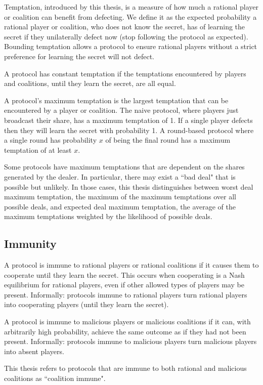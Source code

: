 \documentclass{dalcsthesis}
\begin{document}
Temptation, introduced by this thesis, is a measure of how much a rational player or coalition can benefit from defecting. We define it as the expected probability a rational player or coalition, who does not know the secret, has of learning the secret if they unilaterally defect now (stop following the protocol as expected). Bounding temptation allows a protocol to ensure rational players without a strict preference for learning the secret will not defect.

A protocol has constant temptation if the temptations encountered by players and coalitions, until they learn the secret, are all equal.

A protocol's maximum temptation is the largest temptation that can be encountered by a player or coalition. The naive protocol, where players just broadcast their share, has a maximum temptation of 1. If a single player defects then they will learn the secret with probability 1. A round-based protocol where a single round has probability $x$ of being the final round has a maximum temptation of at least $x$.

Some protocols have maximum temptations that are dependent on the shares generated by the dealer. In particular, there may exist a ``bad deal" that is possible but unlikely. In those cases, this thesis distinguishes between worst deal maximum temptation, the maximum of the maximum temptations over all possible deals, and expected deal maximum temptation, the average of the maximum temptations weighted by the likelihood of possible deals.

\subsection {Immunity}

A protocol is immune to rational players or rational coalitions if it causes them to cooperate until they learn the secret. This occurs when cooperating is a Nash equilibrium for rational players, even if other allowed types of players may be present. Informally: protocols immune to rational players turn rational players into cooperating players (until they learn the secret).

A protocol is immune to malicious players or malicious coalitions if it can, with arbitrarily high probability, achieve the same outcome as if they had not been present. Informally: protocols immune to malicious players turn malicious players into absent players.

This thesis refers to protocols that are immune to both rational and malicious coalitions as ``coalition immune".
\end{document}
